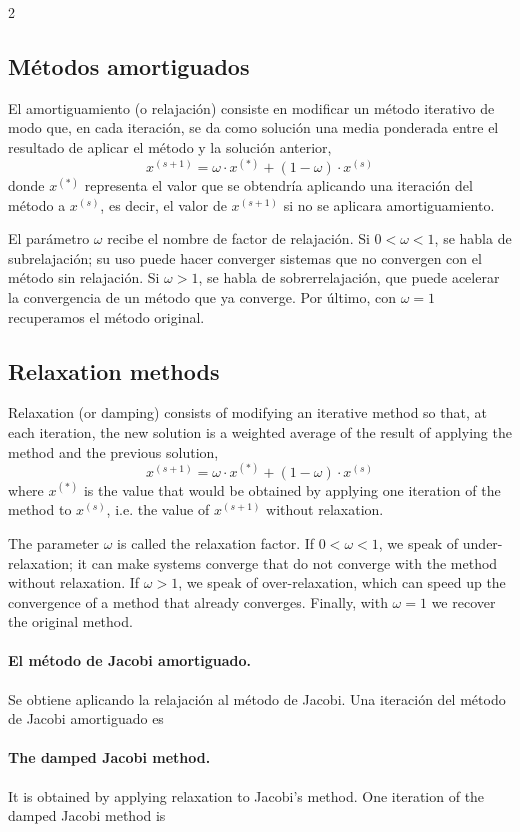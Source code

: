 \begin{paracol}{2}

\subsection{Métodos amortiguados}  El amortiguamiento (o relajación) consiste en modificar un método iterativo de modo que, en cada iteración, se da como solución una media ponderada entre el resultado de aplicar el método y la solución anterior,
\begin{equation*}
x^{(s+1)}=\omega \cdot x^{(*)}+(1-\omega) \cdot x^{(s)}
\end{equation*}
donde $x^{(*)}$ representa el valor que se obtendría aplicando una iteración del método a $x^{(s)}$, es decir, el valor de $x^{(s+1)}$ si no se aplicara amortiguamiento.

El parámetro $\omega$ recibe el nombre de factor de relajación. Si $0<\omega<1$, se habla de subrelajación; su uso puede hacer converger sistemas que no convergen con el método sin relajación. Si $\omega>1$, se habla de sobrerrelajación, que puede acelerar la convergencia de un método que ya converge. Por último, con $\omega=1$ recuperamos el método original.

\switchcolumn
\subsection{Relaxation methods}  Relaxation (or damping) consists of modifying an iterative method so that, at each iteration, the new solution is a weighted average of the result of applying the method and the previous solution,
\begin{equation*}
x^{(s+1)}=\omega \cdot x^{(*)}+(1-\omega) \cdot x^{(s)}
\end{equation*}
where $x^{(*)}$ is the value that would be obtained by applying one iteration of the method to $x^{(s)}$, i.e. the value of $x^{(s+1)}$ without relaxation.

The parameter $\omega$ is called the relaxation factor. If $0<\omega<1$, we speak of under-relaxation; it can make systems converge that do not converge with the method without relaxation. If $\omega>1$, we speak of over-relaxation, which can speed up the convergence of a method that already converges. Finally, with $\omega=1$ we recover the original method.

\switchcolumn

\paragraph{El método de Jacobi amortiguado.}  Se obtiene aplicando la relajación al método de Jacobi. Una iteración del método de Jacobi amortiguado es
\switchcolumn
\paragraph{The damped Jacobi method.}  It is obtained by applying relaxation to Jacobi's method. One iteration of the damped Jacobi method is
\end{paracol}


